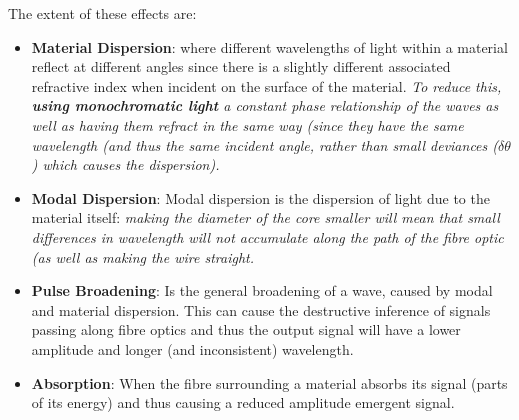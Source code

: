 \documentclass{article}
\begin{document}
The extent of these effects are:
\begin{itemize}
    \item \textbf{Material Dispersion}: where different wavelengths of light within a material reflect at different angles since there is a slightly different associated refractive index when incident on the surface of the material. \textit{To reduce this, \textbf{using monochromatic light} a constant phase relationship of the waves as well as having them refract in the same way (since they have the same wavelength (and thus the same incident angle, rather than small deviances ($\delta\theta$) which causes the dispersion).}
    
    \item \textbf{Modal Dispersion}: Modal dispersion is the dispersion of light due to the material itself: \textit{making the diameter of the core smaller will mean that small differences in wavelength will not accumulate along the path of the fibre optic (as well as making the wire straight.}
    
    \item \textbf{Pulse Broadening}: Is the general broadening of a wave, caused by modal and material dispersion. This can cause the destructive inference of signals passing along fibre optics and thus the output signal will have a lower amplitude and longer (and inconsistent) wavelength. 
    
    \item \textbf{Absorption}: When the fibre surrounding a material absorbs its signal (parts of its energy) and thus causing a reduced amplitude emergent signal. 

    
\end{itemize}
\end{document}
